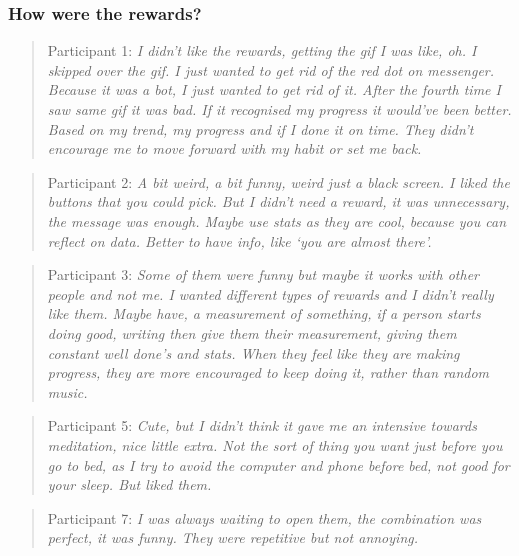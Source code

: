 \subsubsection*{How were the rewards?}
\begin{quote}
Participant 1: \textit{I didn't like the rewards, getting the gif I was like, oh. I skipped over the gif. I just wanted to get rid of the red dot on messenger. Because it was a bot, I just wanted to get rid of it. After the fourth time I saw same gif it was bad. If it recognised my progress it would've been better. Based on my trend, my progress and if I done it on time. They didn't encourage me to move forward with my habit or set me back.}
\end{quote}
\begin{quote}
Participant 2: \textit{A bit weird, a bit funny, weird just a black screen. I liked the buttons that you could pick. But I didn't need a reward, it was unnecessary, the message was enough. Maybe use stats as they are cool, because you can reflect on data. Better to have info, like `you are almost there'.}
\end{quote}
\begin{quote}
Participant 3: \textit{Some of them were funny but maybe it works with other people and not me. I wanted different types of rewards and I didn't really like them. Maybe have, a measurement of something, if a person starts doing good, writing then give them their measurement, giving them constant well done's and stats. When they feel like they are making progress, they are more encouraged to keep doing it, rather than random music.}
\end{quote}
\begin{quote}
Participant 5: \textit{Cute, but I didn't think it gave me an intensive towards meditation, nice little extra. Not the sort of thing you want just before you go to bed, as I try to avoid the computer and phone before bed, not good for your sleep. But liked them.}
\end{quote}
\begin{quote}
Participant 7: \textit{I was always waiting to open them, the combination was perfect, it was funny. They were repetitive but not annoying.}
\end{quote}

